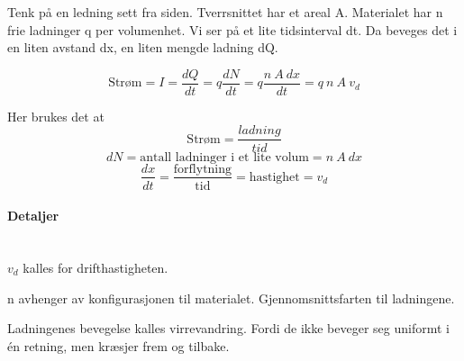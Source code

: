 Tenk på en ledning sett fra siden.
Tverrsnittet har et areal A.
Materialet har n frie ladninger q per volumenhet.
Vi ser på et lite tidsinterval dt.
Da beveges det i en liten avstand dx,
en liten mengde ladning dQ.

$$\text{Strøm}
  = I
  = \frac{dQ}{dt}
  = q \frac{dN}{dt}
  = q \frac{n\ A\ dx}{dt}
  = q\ n\ A\ v_d$$

Her brukes det at
$$\text{Strøm} = \frac{ladning}{tid}$$
$$dN = \text{antall ladninger i et lite volum}= n\ A\ dx$$
$$\frac{dx}{dt} = \frac{\text{forflytning}}{\text{tid}}
                = \text{hastighet} = v_d$$


\paragraph{Detaljer} \hfill \\
$v_d$ kalles for drifthastigheten.

n avhenger av konfigurasjonen til materialet.
Gjennomsnittsfarten til ladningene.

Ladningenes bevegelse kalles virrevandring.
Fordi de ikke beveger seg uniformt i én retning, men kræsjer frem og tilbake.
